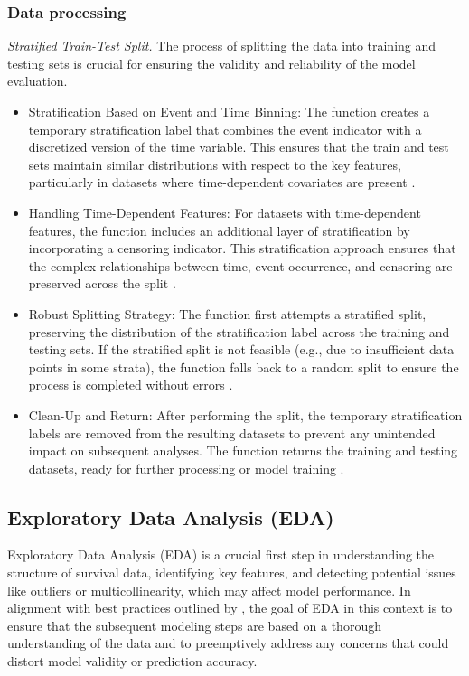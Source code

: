 \subsubsection*{Data processing}
\noindent \textit{Stratified Train-Test Split.} The process of splitting the data into training and testing sets is crucial for ensuring the validity and reliability of the model evaluation. 
\begin{itemize}
    \item Stratification Based on Event and Time Binning: The function creates a temporary stratification label that combines the event indicator with a discretized version of the time variable. This ensures that the train and test sets maintain similar distributions with respect to the key features, particularly in datasets where time-dependent covariates are present \parencite{woo_time_2023}.
    \item Handling Time-Dependent Features: For datasets with time-dependent features, the function includes an additional layer of stratification by incorporating a censoring indicator. This stratification approach ensures that the complex relationships between time, event occurrence, and censoring are preserved across the split \parencite{ichida_evaluation_1993}.
    \item Robust Splitting Strategy: The function first attempts a stratified split, preserving the distribution of the stratification label across the training and testing sets. If the stratified split is not feasible (e.g., due to insufficient data points in some strata), the function falls back to a random split to ensure the process is completed without errors \parencite{scikit-learn}.
    \item Clean-Up and Return: After performing the split, the temporary stratification labels are removed from the resulting datasets to prevent any unintended impact on subsequent analyses. The function returns the training and testing datasets, ready for further processing or model training \parencite{scikit-learn}.
\end{itemize}



\subsection{Exploratory Data Analysis (EDA)}

Exploratory Data Analysis (EDA) is a crucial first step in understanding the structure of survival data, identifying key features, and detecting potential issues like outliers or multicollinearity, which may affect model performance. In alignment with best practices outlined by \parencite{harrell__regression_2015}, the goal of EDA in this context is to ensure that the subsequent modeling steps are based on a thorough understanding of the data and to preemptively address any concerns that could distort model validity or prediction accuracy.

